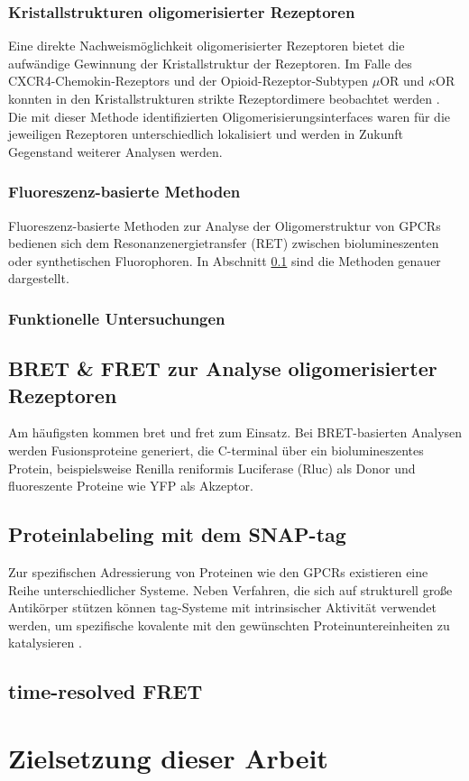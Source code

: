 \subsubsection{Kristallstrukturen oligomerisierter Rezeptoren}
Eine direkte Nachweismöglichkeit oligomerisierter Rezeptoren bietet die aufwändige Gewinnung der Kristallstruktur der Rezeptoren. Im Falle des CXCR4-Chemokin-Rezeptors und der Opioid-Rezeptor-Subtypen $\mu$OR und $\kappa$OR konnten in den Kristallstrukturen strikte Rezeptordimere beobachtet werden \parencite{Wu2010, Manglik2012, Wu2012}. Die mit dieser Methode identifizierten Oligomerisierungsinterfaces waren für die jeweiligen Rezeptoren unterschiedlich lokalisiert und werden in Zukunft Gegenstand weiterer Analysen werden.

\subsubsection{Fluoreszenz-basierte Methoden}
Fluoreszenz-basierte Methoden zur Analyse der Oligomerstruktur von GPCRs bedienen sich dem Resonanzenergietransfer (RET) zwischen biolumineszenten oder synthetischen Fluorophoren. In Abschnitt \ref{ret} sind die Methoden genauer dargestellt.

\subsubsection{Funktionelle Untersuchungen}

\subsection{BRET \& FRET zur Analyse oligomerisierter Rezeptoren}
\label{ret}
Am häufigsten kommen \gls{bret} und \gls{fret} zum Einsatz. Bei BRET-basierten Analysen werden Fusionsproteine generiert, die C-terminal über ein biolumineszentes Protein, beispielsweise Renilla reniformis Luciferase (Rluc) als Donor und fluoreszente Proteine wie YFP als Akzeptor.

\subsection{Proteinlabeling mit dem SNAP-tag}
Zur spezifischen Adressierung von Proteinen wie den GPCRs existieren eine Reihe unterschiedlicher Systeme. Neben Verfahren, die sich auf strukturell große Antikörper stützen können tag-Systeme mit intrinsischer Aktivität verwendet werden, um spezifische kovalente mit den gewünschten Proteinuntereinheiten zu katalysieren \parencite{Gautier2008}.
\subsection{time-resolved FRET}

\section{Zielsetzung dieser Arbeit}
